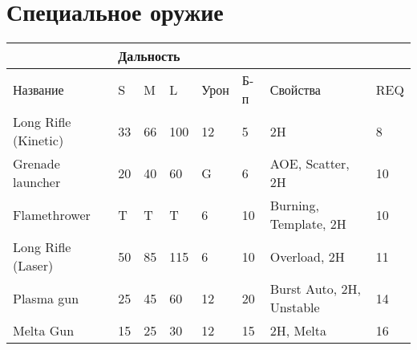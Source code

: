     \section*{Специальное оружие}
        \begin{table}[H]
            \centering
            \begin{tabular}{|l|lll|l|l|l|l|}
                \hline
                                    & \multicolumn{3}{l|}{Дальность}                          &      &     &                          &     \\ \hline
                Название             & \multicolumn{1}{l|}{S}  & \multicolumn{1}{l|}{M}  & L   & Урон & Б-п & Свойства                 & REQ \\ \hline
                Long Rifle (Kinetic) & \multicolumn{1}{l|}{33} & \multicolumn{1}{l|}{66} & 100 & 12   & 5   & 2H                       & 8   \\ \hline
                Grenade launcher     & \multicolumn{1}{l|}{20} & \multicolumn{1}{l|}{40} & 60  & G    & 6   & AOE, Scatter, 2H         & 10  \\ \hline
                Flamethrower         & \multicolumn{1}{l|}{T}  & \multicolumn{1}{l|}{T}  & T   & 6    & 10  & Burning, Template, 2H    & 10  \\ \hline
                Long Rifle (Laser)   & \multicolumn{1}{l|}{50} & \multicolumn{1}{l|}{85} & 115 & 6    & 10  & Overload, 2H             & 11  \\ \hline
                Plasma gun           & \multicolumn{1}{l|}{25} & \multicolumn{1}{l|}{45} & 60  & 12   & 20  & Burst Auto, 2H, Unstable & 14  \\ \hline
                Melta Gun            & \multicolumn{1}{l|}{15} & \multicolumn{1}{l|}{25} & 30  & 12   & 15  & 2H, Melta                & 16  \\ \hline
            \end{tabular}
        \end{table}

